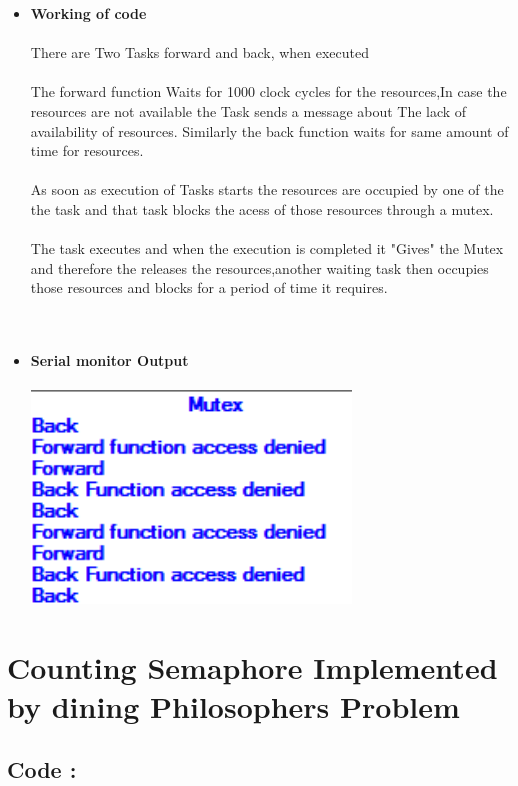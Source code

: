 \documentclass[11pt,a4paper]{article}
\begin{document}
\begin{itemize}
	\item \textbf{Working of code}
	\\
	\\
	There are Two Tasks forward and back, when executed
	\\
	\\
	The forward function Waits for 1000 clock cycles for the resources,In case the resources are not available the Task sends a message about The lack of availability of resources.
		Similarly the back function waits for same amount of time for resources.
	\\
	\\	
	As soon as execution of Tasks starts the resources are occupied by one of the the task and that task blocks the acess of those resources through a mutex.
	\\
	\\
The task executes and when the execution is completed it "Gives" the Mutex and therefore the releases the resources,another waiting task then occupies those resources and blocks for a period of time it requires.
	\\
	\\
	\\
	\item \textbf{Serial monitor Output} 
	\\
	\\
	\includegraphics[width=8.5cm]{mut}
\end{itemize}

\newpage 

\section{Counting Semaphore Implemented by dining Philosophers Problem}

\subsection{Code : }
	
\newpage
\end{document}
